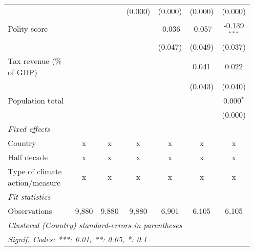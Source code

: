 \begin{tabular}{lcccccc}
                                                                                                       &         &         & (0.000) & (0.000) & (0.000)      & (0.000)\\   
   Polity score                                                                                        &         &         &         & -0.036  & -0.057       & -0.139$^{***}$\\   
                                                                                                       &         &         &         & (0.047) & (0.049)      & (0.037)\\   
   Tax revenue (\% of GDP)                                                                             &         &         &         &         & 0.041        & 0.022\\   
                                                                                                       &         &         &         &         & (0.043)      & (0.040)\\   
   Population total                                                                                    &         &         &         &         &              & 0.000$^{*}$\\   
                                                                                                       &         &         &         &         &              & (0.000)\\   
   \emph{Fixed effects}\\
   Country                                                                                             & x       & x       & x       & x       & x            & x\\  
   Half decade                                                                                         & x       & x       & x       & x       & x            & x\\  
   Type of climate action/measure                                                                      & x       & x       & x       & x       & x            & x\\  
   \midrule \emph{Fit statistics}\\
   Observations                                                                                        & 9,880   & 9,880   & 9,880   & 6,901   & 6,105        & 6,105\\  
   \midrule
   \multicolumn{7}{l}{\emph{Clustered (Country) standard-errors in parentheses}}\\
   \multicolumn{7}{l}{\emph{Signif. Codes: ***: 0.01, **: 0.05, *: 0.1}}\\
\end{tabular}
\par\endgroup


